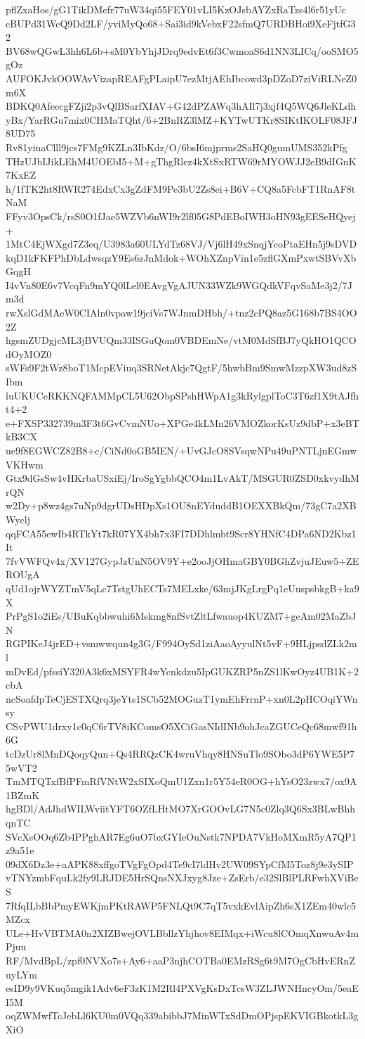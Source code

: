 pflZxaHos/gG1TikDMefr77uW34qi55FEY01vLI5KzOJsbAYZxRaTzs4l6r51yUc
cBUPd31WcQ9Dd2LF/yviMyQo68+Sai3id9kVebxF22sfmQ7URDBHoi9XeFjtfG32
BV68wQGwL3hh6L6b+sM0YbYhjJDrq9edvEt6f3CwmoaS6d1NN3LICq/ooSMO5gOz
AUFOKJvkOOWAvVizapREAFgPLaipU7ezMtjAEhIbcowd3pDZoD7ziViRLNeZ0m6X
BDKQ0AfeecgFZji2p3vQlBSarfXIAV+G42dPZAWq3hAIl7j3xjf4Q5WQ6JleKLdh
yBx/YarRGu7mix0CHMaTQht/6+2BnRZ3lMZ+KYTwUTKr8SIKtIKOLF08JFJ8UD75
Rv81yinaClll9jcs7FMg9KZLn3IbKdz/O/6bsI6mjprms2SaHQ0gumUMS352kPfg
THzUJbIJikLEhM4UOEbI5+M+gThgRlez4kXtSxRTW69rMYOWJJ2eB9dIGnK7KxEZ
h/1fTK2ht8RWR274EdxCx3gZdFM9Pe3bU2Zs8ei+B6V+CQ8a5FcbFT1RnAF8tNaM
FFyv3OpsCk/rsS0O1fJae5WZVb6nWI9r2lf05G8PdEBoIWH3oHN93gEESeHQyej+
1MtC4EjWXgd7Z3eq/U3983a60ULYdTz68VJ/Vj6lH49xSnqjYcoPtaEHn5j9sDVD
kqD1kFKFPhDbLdwsqzY9Es6zJnMdok+WOhXZnpVin1e5zflGXmPxwtSBVvXbGqgH
I4vVn80E6v7VcqFn9mYQ0lLel0EAvgVgAJUN33WZk9WGQdkVFqvSaMe3j2/7Jm3d
rwXslGdMAeW0CIAln0vpaw19jciVs7WJnmDHbh/+tnz2cPQ8az5G168b7BS4OO2Z
hgsmZUDgjcML3jBVUQm33ISGuQom0VBDEmNe/vtM0MdSfBJ7yQkHO1QCOdOyMOZ0
sWFs9F2tWz8boT1McpEViuq3SRNetAkjc7QgtF/5hwbBm9SmwMzzpXW3ud8zSIbm
luUKUCeRKKNQFAMMpCL5U62ObpSPshHWpA1g3kRylgplToC3T6zf1X9tAJfht4+2
e+FXSP332739m3F3t6GvCvmNUo+XPGe4kLMn26VMOZkorKsUz9dbP+x3eBTkB3CX
ue9f8EGWCZ82B8+c/CiNd0oGB5IEN/+UvGJcO8SVsqwNPu49uPNTLjnEGmwVKHwm
Gtx9dGsSw4vHKrbaUSxiEj/IroSgYgbbQCO4m1LvAkT/MSGUR0ZSD0xkvydhMrQN
w2Dy+p8wz4gs7uNp9dgrUDsHDpXs1OU8nEYduddB1OEXXBkQm/73gC7a2XBWyclj
qqFCA55ewIb4RTkYt7kR07YX4bh7x3FI7DDhlmbt9Scr8YHNfC4DPa6ND2Kbz1It
7fvVWFQv4x/XV127GypJzUnN5OV9Y+e2ooJjOHmaGBY0BGhZvjuJEuw5+ZEROUgA
qUd1ojrWYZTmV5qLc7TstgUhECTs7MELxke/63mjJKgLrgPq1eUuspsbkgB+ka9X
PrPgS1o2iEs/UBuKqbbwuhi6Mskmg8nfSvtZltLfwauop4KUZM7+geAm02MaZbJN
RGPIKeJ4jrED+vsmwwqun4g3G/F994OySd1ziAaoAyyulNt5vF+9HLjpsdZLk2ml
mDvEd/pfssiY320A3k6xMSYFR4wYcnkdzu5IpGUKZRP5nZS1lKwOyz4UB1K+2cbA
ncSoafdpTeCjESTXQrq3jeYts1SCb52MOGuzT1ymEhFrrnP+xn0L2pHCOqiYWnsy
CSvPWU1drxy1c0qC6rTV8iKComsO5XCiGasNIdINb9ohJcaZGUCeQc68mwf91h6G
tcDzUr8lMnDQoqyQun+Qs4RRQzCK4wruVhqy8HNSuTlo9SObo3dP6YWE5P75wVT2
TmMTQTxfBfPFmRfVNtW2xSIXoQmU1Zxn1r5Y54eR0OG+hYsO23zwx7/ox9A1BZmK
hgBDl/AdJhdWILWviitYFT6OZfLHtMO7XrGOOvLG7N5c0Zlq3Q6Sx3BLwBhhqnTC
SVcXsOOq6Zb4PPghAR7Eg6uO7bxGYIeOuNstk7NPDA7VkHoMXmR5yA7QP1z9a51e
09dX6Dz3e+aAPK88xffgoTVgFgOpd4Te9cI7ldHv2UW09SYpCfM5Toz8j9e3ySIP
vTNYzmbFquLk2fy9LRJDE5HrSQnsNXJxyg8Jze+ZsErb/e32SlBlPLRFwhXViBeS
7RfqILbBbPmyEWKjmPKtRAWP5FNLQt9C7qT5vxkEvlAipZh6sX1ZEm40wlc5MZcx
ULe+HvVBTMA0n2XIZBwejOVLBbllzYhjhov8EIMqx+iWcu8lCOmqXnwuAv4mPjuu
RF/MvdBpL/zpf0NVXo7s+Ay6+aaP3njhCOTBa0EMzRSg6t9M7OgCbHvERnZuyLYm
esID9y9VKuq5mgik1Adv6eF3zK1M2Rl4PXVgKsDxTcsW3ZLJWNHncyOm/5eaEI5M
oqZWMwfTcJebLl6KU0m0VQq339abibbJ7MinWTxSdDmOPjspEKVIGBkotkL3gXiO
